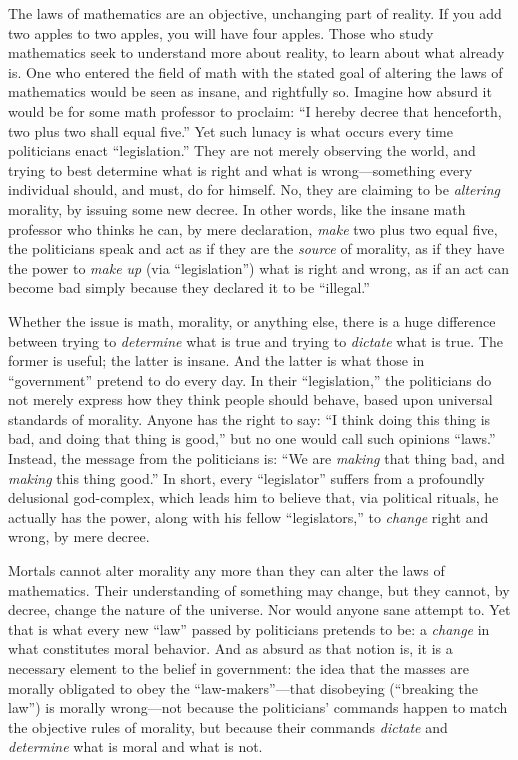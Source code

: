 \documentclass{book}
\begin{document}
The laws of mathematics are an objective, unchanging part of reality. If you add two apples to two apples, you will have four apples. Those who study mathematics seek to understand more about reality, to learn about what already is. One who entered the field of math with the stated goal of altering the laws of mathematics would be seen as insane, and rightfully so. Imagine how absurd it would be for some math professor to proclaim: \enquote{I hereby decree that henceforth, two plus two shall equal five.} Yet such lunacy is what occurs every time politicians enact \enquote{legislation.} They are not merely observing the world, and trying to best determine what is right and what is wrong---something every individual should, and must, do for himself. No, they are claiming to be \emph{altering} morality, by issuing some new decree. In other words, like the insane math professor who thinks he can, by mere declaration, \emph{make} two plus two equal five, the politicians speak and act as if they are the \emph{source} of morality, as if they have the power to \emph{make up} (via \enquote{legislation}) what is right and wrong, as if an act can become bad simply because they declared it to be \enquote{illegal.}

Whether the issue is math, morality, or anything else, there is a huge difference between trying to \emph{determine} what is true and trying to \emph{dictate} what is true. The former is useful; the latter is insane. And the latter is what those in \enquote{government} pretend to do every day. In their \enquote{legislation,} the politicians do not merely express how they think people should behave, based upon universal standards of morality. Anyone has the right to say: \enquote{I think doing this thing is bad, and doing that thing is good,} but no one would call such opinions \enquote{laws.} Instead, the message from the politicians is: \enquote{We are \emph{making} that thing bad, and \emph{making} this thing good.} In short, every \enquote{legislator} suffers from a profoundly delusional god-complex, which leads him to believe that, via political rituals, he actually has the power, along with his fellow \enquote{legislators,} to \emph{change} right and wrong, by mere decree.

Mortals cannot alter morality any more than they can alter the laws of mathematics. Their understanding of something may change, but they cannot, by decree, change the nature of the universe. Nor would anyone sane attempt to. Yet that is what every new \enquote{law} passed by politicians pretends to be: a \emph{change} in what constitutes moral behavior. And as absurd as that notion is, it is a necessary element to the belief in government: the idea that the masses are morally obligated to obey the \enquote{law-makers}---that disobeying (\enquote{breaking the law}) is morally wrong---not because the politicians' commands happen to match the objective rules of morality, but because their commands \emph{dictate} and \emph{determine} what is moral and what is not.
\end{document}
